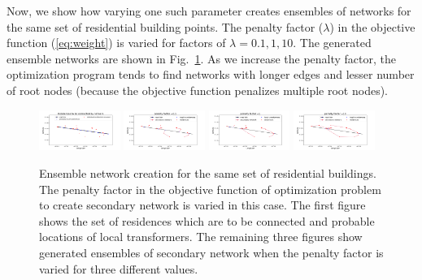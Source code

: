 \documentclass[sigconf]{acmart}
\begin{document}
Now, we show how varying one such parameter creates ensembles of networks for the same set of residential building points. The penalty factor ($\lambda$) in the objective function (\ref{eq:weight}) is varied for factors of $\lambda=0.1,1,10$. The generated ensemble networks are shown in Fig.~\ref{fig:ensemble}. As we increase the penalty factor, the optimization program tends to find networks with longer edges and lesser number of root nodes (because the objective function penalizes multiple root nodes).
\begin{figure}[t]
	\centering
	\includegraphics[width=0.235\textwidth]{figs/secnet.png}
	\includegraphics[width=0.235\textwidth]{figs/secnet-1.png}
	\includegraphics[width=0.235\textwidth]{figs/secnet-2.png}
	\includegraphics[width=0.235\textwidth]{figs/secnet-3.png}
	\caption{Ensemble network creation for the same set of residential buildings. The penalty factor in the objective function of optimization problem to create secondary network is varied in this case. The first figure shows the set of residences which are to be connected and probable locations of local transformers. The remaining three figures show generated ensembles of secondary network when the penalty factor is varied for three different values.}
	\label{fig:ensemble}
\end{figure}
\end{document}
